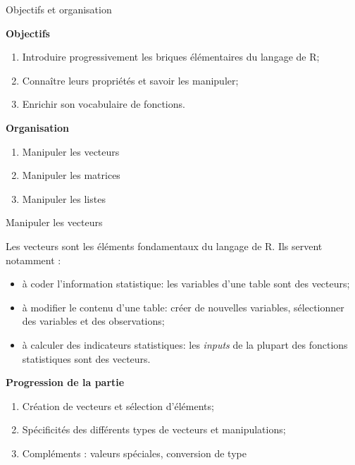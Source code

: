 \documentclass[12pt,ignorenonframetext,]{beamer}
\providecommand{\tightlist}{%
  \setlength{\itemsep}{0pt}\setlength{\parskip}{0pt}}
\newcommand{\strong}[1]{\textbf{\textcolor{redInsee}{#1}}}
\begin{document}
\begin{frame}{Objectifs et organisation}
\protect\hypertarget{objectifs-et-organisation-1}{}

\strong{Objectifs}

\begin{enumerate}
[1.]
\tightlist
\item
  Introduire progressivement les briques élémentaires du langage de R;
\item
  Connaître leurs propriétés et savoir les manipuler;
\item
  Enrichir son vocabulaire de fonctions.
\end{enumerate}

\bigskip \pause \strong{Organisation}

\begin{enumerate}
[1.]
\item
  Manipuler les vecteurs
\item
  Manipuler les matrices
\item
  Manipuler les listes
\end{enumerate}

\end{frame}

\begin{frame}{Manipuler les vecteurs}
\protect\hypertarget{manipuler-les-vecteurs}{}

Les vecteurs sont les éléments fondamentaux du langage de R. Ils servent
notamment :

\begin{itemize}
\tightlist
\item
  à coder l’information statistique: les variables d’une table sont des
  vecteurs;
\item
  à modifier le contenu d’une table: créer de nouvelles variables,
  sélectionner des variables et des observations;
\item
  à calculer des indicateurs statistiques: les \emph{inputs} de la
  plupart des fonctions statistiques sont des vecteurs.
\end{itemize}

\pause \bigskip \strong{Progression de la partie}

\begin{enumerate}
[1.]
\tightlist
\item
  Création de vecteurs et sélection d’éléments;
\item
  Spécificités des différents types de vecteurs et manipulations;
\item
  Compléments : valeurs spéciales, conversion de type
\end{enumerate}

\end{frame}
\end{document}
